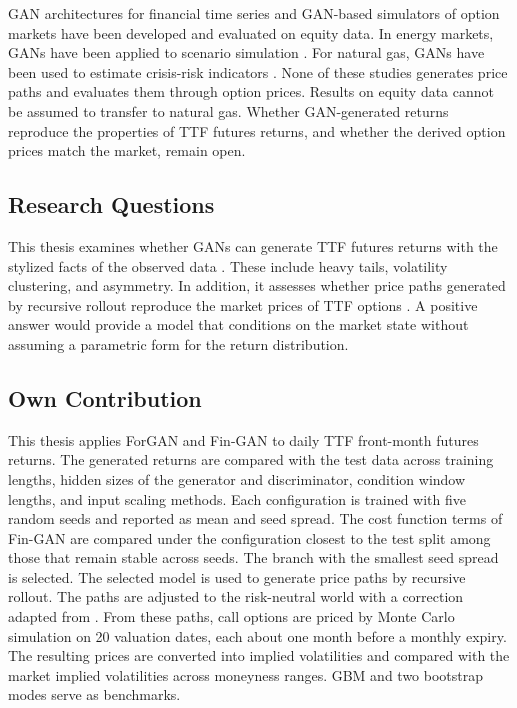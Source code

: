 GAN architectures for financial time series \parencite{yoonTimeseriesGenerativeAdversarial,wieseQuantGANsDeep2020,niConditionalSigWassersteinGANs2020,zhangVisualRealismReliable2026} and GAN-based simulators of option markets \parencite{wieseDeepHedgingLearning2019,vuleticVolGANGenerativeModel2024} have been developed and evaluated on equity data. In energy markets, GANs have been applied to scenario simulation \parencite{walterProbabilisticSimulationElectricity2024,kornSimulatingIntradayElectricity2025}. For natural gas, GANs have been used to estimate crisis-risk indicators \parencite{bohorquezcorreaTimevaryingSystemicRisk2026}. None of these studies generates price paths and evaluates them through option prices. Results on equity data cannot be assumed to transfer to natural gas. Whether GAN-generated returns reproduce the properties of TTF futures returns, and whether the derived option prices match the market, remain open.

\subsection{Research Questions}\label{sec:research-question}

This thesis examines whether GANs can generate TTF futures returns with the stylized facts of the observed data . These include heavy tails, volatility clustering, and asymmetry. In addition, it assesses whether price paths generated by recursive rollout reproduce the market prices of TTF options . A positive answer would provide a model that conditions on the market state without assuming a parametric form for the return distribution.

\subsection{Own Contribution}\label{sec:contribution}
This thesis applies ForGAN and Fin-GAN to daily TTF front-month futures returns. The generated returns are compared with the test data across training lengths, hidden sizes of the generator and discriminator, condition window lengths, and input scaling methods. Each configuration is trained with five random seeds and reported as mean and seed spread. The cost function terms of Fin-GAN are compared under the configuration closest to the test split among those that remain stable across seeds. The branch with the smallest seed spread is selected. The selected model is used to generate price paths by recursive rollout. The paths are adjusted to the risk-neutral world with a correction adapted from \textcite{jin-chuanduan1995}. From these paths, call options are priced by Monte Carlo simulation on \num{20} valuation dates, each about one month before a monthly expiry. The resulting prices are converted into implied volatilities and compared with the market implied volatilities across moneyness ranges. GBM and two bootstrap modes serve as benchmarks.

